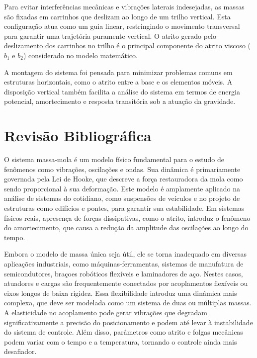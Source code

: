 \documentclass[9pt,a4paper,twocolumn,twoside]{tau-class/tau}
\begin{document}
Para evitar interferências mecânicas e vibrações laterais indesejadas, as massas são fixadas em carrinhos que deslizam ao longo de um trilho vertical. Esta configuração atua como um guia linear, restringindo o movimento transversal para garantir uma trajetória puramente vertical. O atrito gerado pelo deslizamento dos carrinhos no trilho é o principal componente do atrito viscoso ($b_1$ e $b_2$) considerado no modelo matemático.

A montagem do sistema foi pensada para minimizar problemas comuns em estruturas horizontais, como o atrito entre a base e os elementos móveis. A disposição vertical também facilita a análise do sistema em termos de energia potencial, amortecimento e resposta transitória sob a atuação da gravidade.


\section{Revisão Bibliográfica}

O sistema massa-mola é um modelo físico fundamental para o estudo de fenômenos como vibrações, oscilações e ondas. Sua dinâmica é primariamente governada pela Lei de Hooke, que descreve a força restauradora da mola como sendo proporcional à sua deformação. Este modelo é amplamente aplicado na análise de sistemas do cotidiano, como suspensões de veículos e no projeto de estruturas como edifícios e pontes, para garantir sua estabilidade. Em sistemas físicos reais, apresença de forças dissipativas, como o atrito, introduz o fenômeno do amortecimento, que causa a redução da amplitude das oscilações ao longo do tempo. \cite{SistemaMassaMola}

Embora o modelo de massa única seja útil, ele se torna inadequado em diversas aplicações industriais, como máquinas-ferramentas, sistemas de manufatura de semicondutores, braçoes robóticos flexíveis e laminadores de aço. Nestes casos, atuadores e cargas são frequentemente conectados por acoplamentos flexíveis ou eixos longos de baixa rigidez. Essa flexibilidade introduz uma dinâmica mais complexa, que deve ser modelada como um sistema de duas ou  múltiplas massas. A elasticidade no acoplamento pode gerar vibrações que degradam significativamente a precisão do posicionamento e podem até levar à instabilidade do sistema de controle. Além disso, parâmetros como atrito e folgas mecânicas podem variar com o tempo e a temperatura, tornando o controle ainda mais desafiador. \cite{ComparativeStudy}
\end{document}

